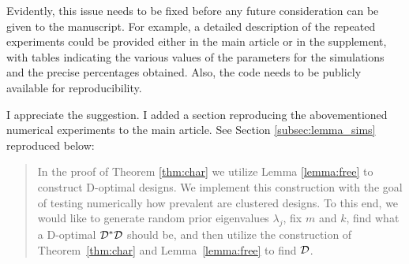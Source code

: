 \RC Evidently, this issue needs to be fixed before any future
consideration can be given to the manuscript. For example, a detailed
description of the repeated experiments could be provided either in
the main article or in the supplement, with tables indicating the
various values of the parameters for the simulations and the precise
percentages obtained. Also, the code needs to be publicly available
for reproducibility.

\AR I appreciate the suggestion. I added a section reproducing the
abovementioned numerical experiments to the main article. See Section
\ref{subsec:lemma_sims} reproduced below:


\begin{quote} %
  In the proof of Theorem \ref{thm:char} we utilize Lemma
\ref{lemma:free} to construct D-optimal designs. We implement this
construction with the goal of testing numerically how prevalent are
clustered designs. To this end, we would like to generate random prior
eigenvalues $\lambda_j$, fix $m$ and $k$, find what a D-optimal
$\mathcal{D}^*\mathcal{D}$ should be, and then utilize the construction of
Theorem~\ref{thm:char} and Lemma~\ref{lemma:free} to find $\mathcal{D}$.



\end{quote}
